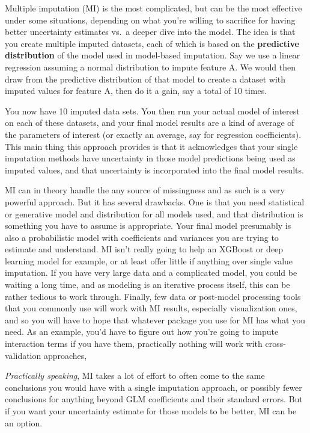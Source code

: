 \documentclass[
  letterpaper,
]{krantz}
\begin{document}
Multiple imputation (MI) is the most complicated, but can be the most
effective under some situations, depending on what you're willing to
sacrifice for having better uncertainty estimates vs.~a deeper dive into
the model. The idea is that you create multiple imputed datasets, each
of which is based on the \textbf{predictive distribution} of the model
used in model-based imputation. Say we use a linear regression assuming
a normal distribution to impute feature A. We would then draw from the
predictive distribution of that model to create a dataset with imputed
values for feature A, then do it a gain, say a total of 10 times.

You now have 10 imputed data sets. You then run your actual model of
interest on each of these datasets, and your final model results are a
kind of average of the parameters of interest (or exactly an average,
say for regression coefficients). This main thing this approach provides
is that it acknowledges that your single imputation methods have
uncertainty in those model predictions being used as imputed values, and
that uncertainty is incorporated into the final model results.

MI can in theory handle the any source of missingness and as such is a
very powerful approach. But it has several drawbacks. One is that you
need statistical or generative model and distribution for all models
used, and that distribution is something you have to assume is
appropriate. Your final model presumably is also a probabilistic model
with coefficients and variances you are trying to estimate and
understand. MI isn't really going to help an XGBoost or deep learning
model for example, or at least offer little if anything over single
value imputation. If you have very large data and a complicated model,
you could be waiting a long time, and as modeling is an iterative
process itself, this can be rather tedious to work through. Finally, few
data or post-model processing tools that you commonly use will work with
MI results, especially visualization ones, and so you will have to hope
that whatever package you use for MI has what you need. As an example,
you'd have to figure out how you're going to impute interaction terms if
you have them, practically nothing will work with cross-validation
approaches,

\emph{Practically speaking}, MI takes a lot of effort to often come to
the same conclusions you would have with a single imputation approach,
or possibly fewer conclusions for anything beyond GLM coefficients and
their standard errors. But if you want your uncertainty estimate for
those models to be better, MI can be an option.
\end{document}
